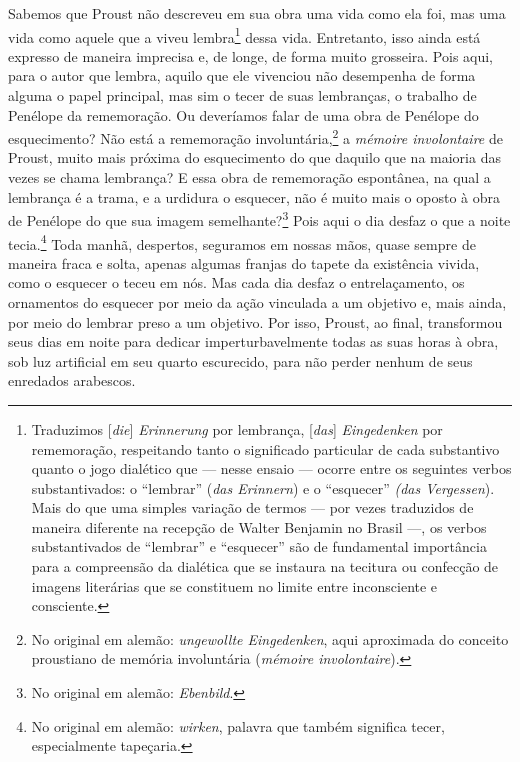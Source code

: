Sabemos que Proust não descreveu em sua obra uma vida como ela foi, mas
uma vida como aquele que a viveu lembra\footnote{Traduzimos
  {[}\emph{die}{]} \emph{Erinnerung} por lembrança, {[}\emph{das}{]}
  \emph{Eingedenken} por rememoração, respeitando tanto o significado
  particular de cada substantivo quanto o jogo dialético que --- nesse
  ensaio --- ocorre entre os seguintes verbos substantivados: o ``lembrar'' (\emph{das Erinnern}) e o ``esquecer'' \emph{(das
  Vergessen}). Mais do que uma simples variação de termos --- por vezes
  traduzidos de maneira diferente na recepção de Walter Benjamin no
  Brasil ---, os verbos substantivados de ``lembrar'' e ``esquecer'' são
  de fundamental importância para a compreensão da dialética que se
  instaura na tecitura ou confecção de imagens literárias que se
  constituem no limite entre inconsciente e consciente. \versal{[N.~T.]}} dessa vida.
Entretanto, isso ainda está expresso de maneira imprecisa e, de longe, de
forma muito grosseira. Pois aqui, para o autor que lembra, aquilo que ele vivenciou não
desempenha de forma alguma o papel principal,
mas sim o tecer de suas lembranças, o trabalho de Penélope da
rememoração. Ou deveríamos falar de uma obra de Penélope do
esquecimento? Não está a rememoração involuntária,\footnote{No
  original em alemão: \emph{ungewollte Eingedenken}, aqui aproximada do
  conceito proustiano de memória involuntária (\emph{mémoire
  involontaire}). \versal{[N.~T.]}} a \emph{mémoire involontaire} de Proust, muito mais
próxima do esquecimento do que daquilo que na maioria das vezes se chama
lembrança? E essa obra de rememoração espontânea, na qual a lembrança é
a trama, e a urdidura o esquecer, não é muito mais o oposto à obra de
Penélope do que sua imagem semelhante?\footnote{No original em alemão:
  \emph{Ebenbild}. \versal{[N.~T.]}} Pois aqui o dia desfaz o que a noite
tecia.\footnote{No original em alemão: \emph{wirken}, palavra que
  também significa tecer, especialmente tapeçaria. \versal{[N.~T.]}} Toda manhã,
despertos, seguramos em nossas mãos, quase sempre de maneira fraca e
solta, apenas algumas franjas do tapete da existência vivida, como o
esquecer o teceu em nós. Mas cada dia desfaz o entrelaçamento, os
ornamentos do esquecer por meio da ação vinculada a um objetivo e, mais
ainda, por meio do lembrar preso a um objetivo. Por isso, Proust, ao
final, transformou seus dias em noite para dedicar imperturbavelmente
todas as suas horas à obra, sob luz artificial em seu quarto escurecido,
para não perder nenhum de seus enredados arabescos.

